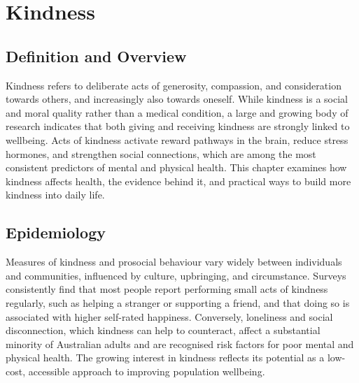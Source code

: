 \chapter{Kindness}

\section*{Definition and Overview}
Kindness refers to deliberate acts of generosity, compassion, and consideration towards others, and increasingly also towards oneself. While kindness is a social and moral quality rather than a medical condition, a large and growing body of research indicates that both giving and receiving kindness are strongly linked to wellbeing. Acts of kindness activate reward pathways in the brain, reduce stress hormones, and strengthen social connections, which are among the most consistent predictors of mental and physical health. This chapter examines how kindness affects health, the evidence behind it, and practical ways to build more kindness into daily life.

\section*{Epidemiology}
Measures of kindness and prosocial behaviour vary widely between individuals and communities, influenced by culture, upbringing, and circumstance. Surveys consistently find that most people report performing small acts of kindness regularly, such as helping a stranger or supporting a friend, and that doing so is associated with higher self-rated happiness. Conversely, loneliness and social disconnection, which kindness can help to counteract, affect a substantial minority of Australian adults and are recognised risk factors for poor mental and physical health. The growing interest in kindness reflects its potential as a low-cost, accessible approach to improving population wellbeing.

